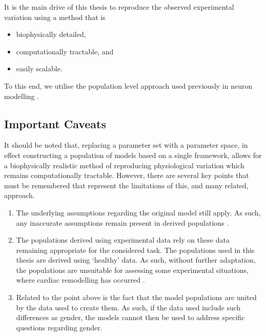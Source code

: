 \documentclass[../thesis-main.tex]{subfiles}
\begin{document}
 It is the main drive of this thesis to reproduce the observed experimental variation using a method that is
 \begin{itemize}
  \item biophysically detailed,
  \item computationally tractable, and
  \item easily scalable.
 \end{itemize}
 To this end, we utilise the population level approach used previously in neuron modelling \citep{Marder2011}.
 
 \subsection{Important Caveats}
 \label{subsec:caveats}
 It should be noted that, replacing a parameter set with a parameter space, in effect constructing a population of models based on a single framework, allows for a biophysically realistic method of reproducing physiological variation which remains computationally tractable. However, there are several key points that must be remembered that represent the limitations of this, and many related, approach.
 \begin{enumerate}
  \item The underlying assumptions regarding the original model still apply. As such, any inaccurate assumptions remain present in derived populations \citet{Noble2001, Quinn2013}.
  \item The populations derived using experimental data rely on these data remaining appropriate for the considered task. The populations used in this thesis are derived using `healthy' data. As such, without further adaptation, the populations are unsuitable for assessing some experimental situations, \eg{} where cardiac remodelling has occurred \citep{Walmsley2013}.
  \item Related to the point above is the fact that the model populations are united by the data used to create them. As such, if the data used include such differences as gender, the models cannot then be used to address specific questions regarding gender.
 \end{enumerate}
 
 
\end{document}
